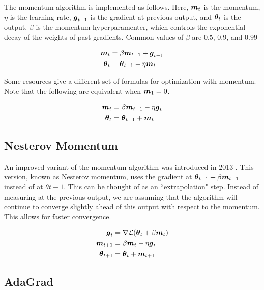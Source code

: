 \documentclass{article}
\begin{document}
The momentum algorithm is implemented as follows. Here, \(\vb*{m}_t\) is the momentum, \(\eta\) is the learning rate, \(\vb*{g}_{t-1}\) is the gradient at previous output, and \(\vb*{\theta}_t\) is the output. \(\beta\) is the momentum hyperparamenter, which controls the exponential decay of the weights of past gradients. Common values of \(\beta\) are \(0.5\), \(0.9\), and \(0.99\) \cite{pml1book}


\begin{align*}
    \vb*{m}_t &= \beta \vb*{m}_{t-1} + \vb*{g}_{t-1} \\
    \vb*{\theta}_t &= \vb*{\theta}_{t-1} - \eta \vb*{m}_t
\end{align*}

Some resources give a different set of formulas for optimization with momentum. Note that the following are equivalent when \(\vb*{m}_1 = 0\).

\begin{align*}
    \vb*{m}_t &= \beta \vb*{m}_{t-1} - \eta \vb*{g}_t \\
    \vb*{\theta}_t &= \vb*{\theta}_{t-1} + \vb*{m}_t
\end{align*}

\subsection{Nesterov Momentum}

An improved variant of the momentum algorithm was introduced in 2013 \cite{sutskever13}. This version, known as Nesterov momentum, uses the gradient at \(\vb*{\theta}_{t-1} + \beta \vb*{m}_{t-1}\) instead of at \(\theta{t-1}\). This can be thought of as an ``extrapolation" step. Instead of measuring at the previous output, we are assuming that the algorithm will continue to converge slightly ahead of this output with respect to the momentum. This allows for faster convergence.

\begin{align*}
    \vb*{g}_{t} &= \nabla \mathcal{L} (\vb*{\theta}_{t} + \beta \vb*{m}_{t}) \\
    \vb*{m}_{t+1} &= \beta \vb*{m}_{t} - \eta \vb*{g}_t \\
    \vb*{\theta}_{t+1} &= \vb*{\theta}_t + \vb*{m}_{t+1}
\end{align*}


\subsection{AdaGrad} %
\end{document}
